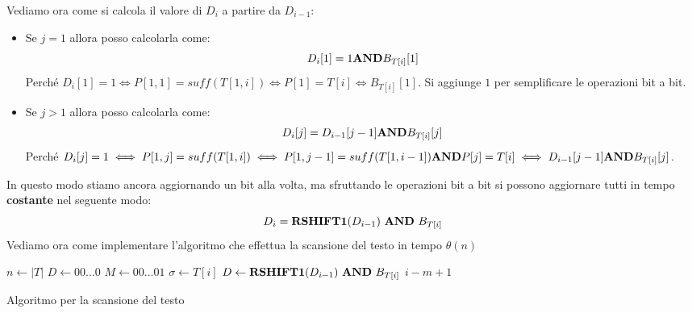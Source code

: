 Vediamo ora come si calcola il valore di $D_i$ a partire da $D_{i - 1}$:
\begin{itemize}
    \item Se $j =  1$ allora posso calcolarla come:
          \begin{equation}
              D_i[1] = 1 \text{\textbf{AND}} B_{T[i]}[1]
          \end{equation}
          Perché $D_i[1] = 1\iff P[1,1] =suff(T[1,i])\iff P[1] = T[i]\iff B_{T[i]}[1]$.
          Si aggiunge $1$ per semplificare le operazioni bit a bit.
    \item Se $j > 1$ allora posso calcolarla come:
          \begin{equation}
              D_i[j] = D_{i - 1}[j - 1] \text{\textbf{AND}} B_{T[i]}[j]
          \end{equation}
          Perché $D_i[j] = 1 \iff P[1,j] = suff(T[1,i]) \iff P[1,j-1] = suff(T[1,i-1])
              \text{\textbf{AND}} P[j] = T[i] \iff D_{i-1}[j-1] \text{\textbf{AND}} B_{T[i]}[j]$.
\end{itemize}
In questo modo stiamo ancora aggiornando un bit alla volta, ma sfruttando le
operazioni bit a bit si possono aggiornare tutti in tempo \textbf{costante} nel seguente modo:
\begin{equation}
    D_i = \text{\textbf{RSHIFT1}}(D_{i - 1}) \ \text{\textbf{AND}} \ B_{T[i]}
\end{equation}
Vediamo ora come implementare l'algoritmo che effettua la scansione del testo in tempo $\theta(n)$
\begin{algorithm}
    \begin{algorithmic}
        \State $n \gets |T|$
        \State $D \gets 00\dots0$
        \State $M \gets 00\dots01$
        \State $\sigma \gets T[i]$
        \State $D \gets \text{\textbf{RSHIFT1}}(D_{i - 1}) \ \text{\textbf{AND}} \ B_{T[i]}$
        \State {} $i - m + 1$
        \EndIf
        \EndFor
        \EndFunction
    \end{algorithmic}
    \caption{Algoritmo per la scansione del testo}
\end{algorithm}
